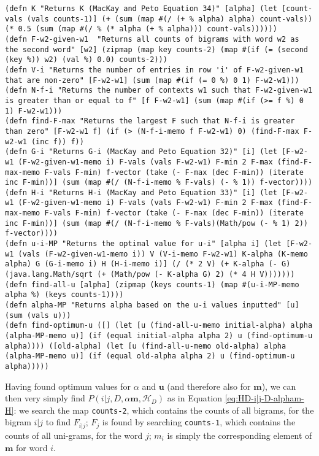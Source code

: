 \begin{lstlisting}
(defn K "Returns K (MacKay and Peto Equation 34)" [alpha] (let [count-vals (vals counts-1)] (+ (sum (map #(/ (+ % alpha) alpha) count-vals)) (* 0.5 (sum (map #(/ % (* alpha (+ % alpha))) count-vals))))))
(defn F-w2-given-w1  "Returns all counts of bigrams with word w2 as the second word" [w2] (zipmap (map key counts-2) (map #(if (= (second (key %)) w2) (val %) 0.0) counts-2)))
(defn V-i "Returns the number of entries in row 'i' of F-w2-given-w1 that are non-zero" [F-w2-w1] (sum (map #(if (= 0 %) 0 1) F-w2-w1)))
(defn N-f-i "Returns the number of contexts w1 such that F-w2-given-w1 is greater than or equal to f" [f F-w2-w1] (sum (map #(if (>= f %) 0 1) F-w2-w1)))
(defn find-F-max "Returns the largest F such that N-f-i is greater than zero" [F-w2-w1 f] (if (> (N-f-i-memo f F-w2-w1) 0) (find-F-max F-w2-w1 (inc f)) f))
(defn G-i "Returns G-i (MacKay and Peto Equation 32)" [i] (let [F-w2-w1 (F-w2-given-w1-memo i) F-vals (vals F-w2-w1) F-min 2 F-max (find-F-max-memo F-vals F-min) f-vector (take (- F-max (dec F-min)) (iterate inc F-min))] (sum (map #(/ (N-f-i-memo % F-vals) (- % 1)) f-vector))))
(defn H-i "Returns H-i (MacKay and Peto Equation 33)" [i] (let [F-w2-w1 (F-w2-given-w1-memo i) F-vals (vals F-w2-w1) F-min 2 F-max (find-F-max-memo F-vals F-min) f-vector (take (- F-max (dec F-min)) (iterate inc F-min))] (sum (map #(/ (N-f-i-memo % F-vals)(Math/pow (- % 1) 2)) f-vector))))
(defn u-i-MP "Returns the optimal value for u-i" [alpha i] (let [F-w2-w1 (vals (F-w2-given-w1-memo i)) V (V-i-memo F-w2-w1) K-alpha (K-memo alpha) G (G-i-memo i) H (H-i-memo i)] (/ (* 2 V) (+ K-alpha (- G) (java.lang.Math/sqrt (+ (Math/pow (- K-alpha G) 2) (* 4 H V)))))))
(defn find-all-u [alpha] (zipmap (keys counts-1) (map #(u-i-MP-memo alpha %) (keys counts-1))))
(defn alpha-MP "Returns alpha based on the u-i values inputted" [u] (sum (vals u)))
(defn find-optimum-u ([] (let [u (find-all-u-memo initial-alpha) alpha (alpha-MP-memo u)] (if (equal initial-alpha alpha 2) u (find-optimum-u alpha)))) ([old-alpha] (let [u (find-all-u-memo old-alpha) alpha (alpha-MP-memo u)] (if (equal old-alpha alpha 2) u (find-optimum-u alpha)))))
\end{lstlisting}

Having found optimum values for $\alpha$ and $\boldsymbol{u}$ (and therefore also for $\boldsymbol{m}$), we can then very simply find $P(i|j,D,\alpha\boldsymbol{m},\mathscr{H}_{D})$ as in Equation \ref{eq:HD-i|j-D-alpham-H}: we search the map \lstinline!counts-2!, which contains the counts of all bigrams, for the bigram $i|j$ to find $F_{i|j}$; $F_{j}$ is found by searching \lstinline!counts-1!, which contains the counts of all uni-grams, for the word $j$; $m_{i}$ is simply the corresponding element of $\boldsymbol{m}$ for word $i$.

